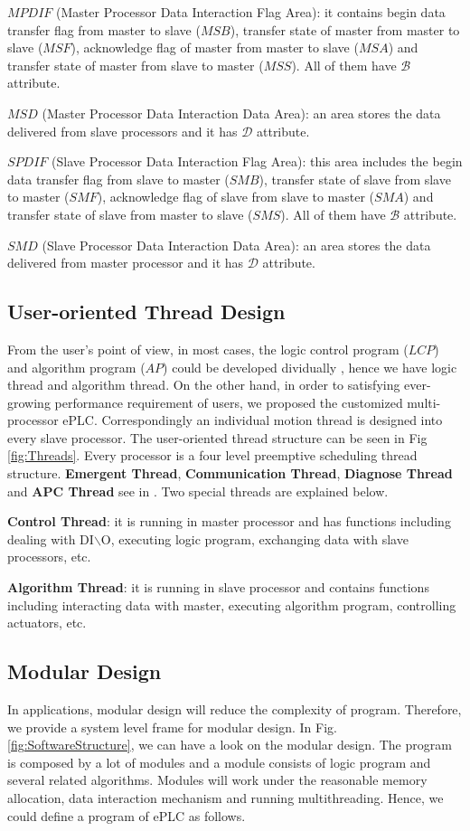 \documentclass[journal,UTF8]{IEEEtran}
\begin{document}
\textbf{$MPDIF$} (Master Processor Data Interaction Flag Area): it contains begin data transfer flag from master to slave ($MSB$), transfer state of master from master to slave ($MSF$), acknowledge flag of master from master to slave ($MSA$) and transfer state of master from slave to master ($MSS$). All of them have $\mathcal{B}$ attribute.

\textbf{$MSD$} (Master Processor Data Interaction Data Area): an area stores the data delivered from slave processors and it has $\mathcal{D}$ attribute.

\textbf{$SPDIF$} (Slave Processor Data Interaction Flag Area): this area includes the begin data transfer flag from slave to master ($SMB$), transfer state of slave from slave to master ($SMF$), acknowledge flag of slave from slave to master ($SMA$) and transfer state of slave from master to slave ($SMS$). All of them have $\mathcal{B}$ attribute.

\textbf{$SMD$} (Slave Processor Data Interaction Data Area): an area stores the data delivered from master processor and it has $\mathcal{D}$ attribute.

\subsection{User-oriented Thread Design}
From the user's point of view, in most cases, the logic control program ($LCP$) and algorithm program ($AP$) could be developed dividually \cite{WuA}, hence we have logic thread and algorithm thread. On the other hand, in order to satisfying ever-growing performance requirement of users, we proposed the customized multi-processor ePLC. Correspondingly 
an individual motion thread is designed into every slave processor. The user-oriented thread structure can be seen in Fig \ref{fig:Threads}. Every processor is a four level preemptive scheduling thread structure. \textbf{Emergent Thread}, \textbf{Communication Thread}, \textbf{Diagnose Thread} and \textbf{APC Thread} see in \cite{WuA}. Two special threads are explained below.

\textbf{Control Thread}: it is running in master processor and has functions including dealing with DI$\backslash$O, executing logic program, exchanging data with slave processors, etc.

\textbf{Algorithm Thread}: it is running in slave processor and contains functions including interacting data with master, executing algorithm program, controlling actuators, etc.

\subsection{Modular Design}  
In applications, modular design will reduce the complexity of program. Therefore, we provide a system level frame for modular design. In Fig. \ref{fig:SoftwareStructure}, we can have a look on the modular design. The program is composed by a lot of modules and a module consists of logic program and several related algorithms. Modules will work under the reasonable memory allocation, data interaction mechanism and  running multithreading. Hence, we could define a program of ePLC as follows.
\end{document}
